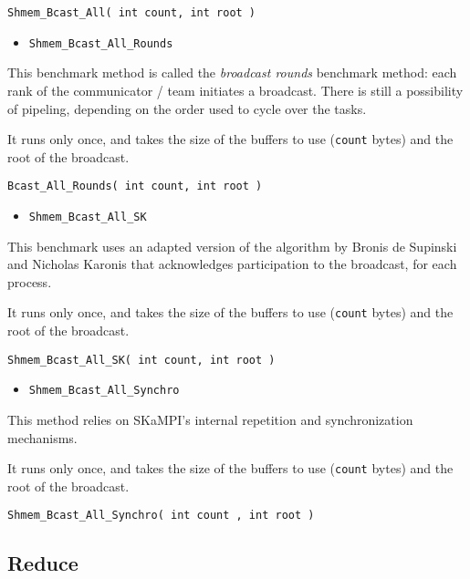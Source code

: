 \documentclass[12pt, letterpaper]{article}
\begin{document}
\begin{lstlisting}
Shmem_Bcast_All( int count, int root )
\end{lstlisting}

\begin{itemize}
    \item {\tt Shmem\_Bcast\_All\_Rounds}
\end{itemize}

This benchmark method is called the \emph{broadcast rounds} benchmark method: each rank  of the communicator / team initiates a broadcast. There is still a possibility of pipeling, depending on the order used to cycle over the tasks. 

 It runs only once, and takes the size of the buffers to use ({\tt count} bytes) and the root of the broadcast.

\begin{lstlisting}
Bcast_All_Rounds( int count, int root )
\end{lstlisting}

\begin{itemize}
    \item {\tt Shmem\_Bcast\_All\_SK}
\end{itemize}

This benchmark uses an adapted version of the algorithm by Bronis de Supinski and Nicholas Karonis that acknowledges participation to the broadcast, for each process.

 It runs only once, and takes the size of the buffers to use ({\tt count} bytes) and the root of the broadcast.

\begin{lstlisting}
Shmem_Bcast_All_SK( int count, int root )
\end{lstlisting}

\begin{itemize}
    \item {\tt Shmem\_Bcast\_All\_Synchro}
\end{itemize}

This method relies on SKaMPI's internal repetition and synchronization mechanisms. 

 It runs only once, and takes the size of the buffers to use ({\tt count} bytes) and the root of the broadcast.

\begin{lstlisting}
Shmem_Bcast_All_Synchro( int count , int root )
\end{lstlisting}
	
\subsection{Reduce}
	 
\end{document}

